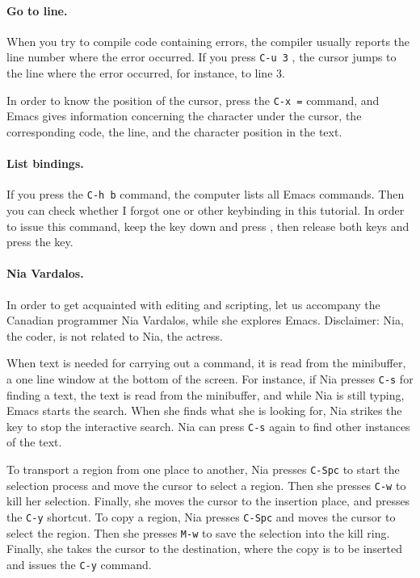 \documentclass[a4paper,12pt]{book}
\begin{document}
\paragraph{Go to line.} When you try to compile
code containing errors, the compiler
usually reports the line number where the error occurred.
If you press \verb|C-u 3| ,
the cursor jumps to the line where the error occurred,
for instance, to line 3.

In order to know the position of the cursor, press
the \verb|C-x =| command, and Emacs gives information
concerning the character under the cursor, the corresponding
code, the line, and the character position in the text.

\paragraph{List bindings.} If you press
the \verb|C-h b| command, the computer
lists all Emacs commands. Then you
can check whether I forgot one or other keybinding in this
tutorial. In order to issue this command, keep
the  key down and press , then release
both keys and press the  key.

\paragraph{Nia Vardalos.}
In order to get acquainted with editing and scripting,
let us accompany the Canadian programmer Nia Vardalos,
while she explores Emacs. Disclaimer: Nia, the coder,
is not related to Nia, the actress.

When text is needed for carrying out a command,
it is read from the minibuffer, a one line
window at the bottom of the screen. For instance, 
if Nia presses \verb|C-s| for finding a text, 
the text is read from the minibuffer, and while Nia is
still typing, Emacs starts the search. When she finds
what she is looking for, Nia strikes the 
key to stop the interactive search. Nia can press
\verb|C-s| again to find other instances of the text. 

To transport a region from one place to another,
Nia presses \verb|C-Spc| to start
 the selection process and move the cursor to select
 a region.  Then she presses \verb|C-w| to kill her
 selection. Finally, she moves the cursor to the
 insertion place, and presses the \verb|C-y| shortcut.
To copy a region, Nia presses \verb|C-Spc| and moves
the cursor to select the region. Then she presses
\verb|M-w| to save the selection into the kill ring. Finally,
she takes the cursor to the destination, where the copy is to
be inserted and issues the \verb|C-y| command.
\end{document}
